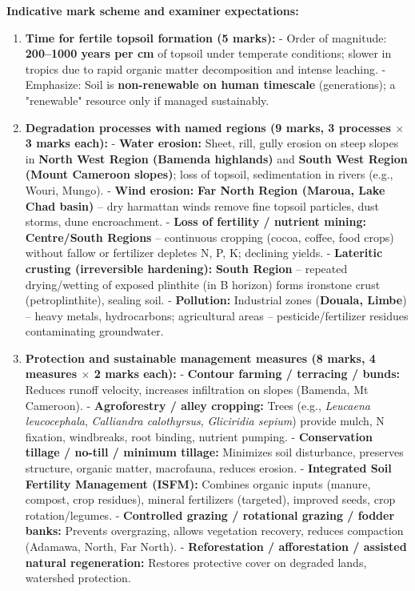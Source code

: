 \documentclass[11pt]{article}
\begin{document}
\begin{corrige}
\textbf{Indicative mark scheme and examiner expectations:}
\begin{enumerate}
\item \textbf{Time for fertile topsoil formation (5 marks):}  
  - Order of magnitude: \textbf{200–1000 years per cm} of topsoil under temperate conditions; slower in tropics due to rapid organic matter decomposition and intense leaching.  
  - Emphasize: Soil is \textbf{non-renewable on human timescale} (generations); a "renewable" resource only if managed sustainably.

\item \textbf{Degradation processes with named regions (9 marks, 3 processes $\times$ 3 marks each):}  
  - \textbf{Water erosion:} Sheet, rill, gully erosion on steep slopes in \textbf{North West Region (Bamenda highlands)} and \textbf{South West Region (Mount Cameroon slopes)}; loss of topsoil, sedimentation in rivers (e.g., Wouri, Mungo).  
  - \textbf{Wind erosion:} \textbf{Far North Region (Maroua, Lake Chad basin)} – dry harmattan winds remove fine topsoil particles, dust storms, dune encroachment.  
  - \textbf{Loss of fertility / nutrient mining:} \textbf{Centre/South Regions} – continuous cropping (cocoa, coffee, food crops) without fallow or fertilizer depletes N, P, K; declining yields.  
  - \textbf{Lateritic crusting (irreversible hardening):} \textbf{South Region} – repeated drying/wetting of exposed plinthite (in B horizon) forms ironstone crust (petroplinthite), sealing soil.  
  - \textbf{Pollution:} Industrial zones (\textbf{Douala, Limbe}) – heavy metals, hydrocarbons; agricultural areas – pesticide/fertilizer residues contaminating groundwater.

\item \textbf{Protection and sustainable management measures (8 marks, 4 measures $\times$ 2 marks each):}  
  - \textbf{Contour farming / terracing / bunds:} Reduces runoff velocity, increases infiltration on slopes (Bamenda, Mt Cameroon).  
  - \textbf{Agroforestry / alley cropping:} Trees (e.g., \textit{Leucaena leucocephala}, \textit{Calliandra calothyrsus}, \textit{Gliciridia sepium}) provide mulch, N fixation, windbreaks, root binding, nutrient pumping.  
  - \textbf{Conservation tillage / no-till / minimum tillage:} Minimizes soil disturbance, preserves structure, organic matter, macrofauna, reduces erosion.  
  - \textbf{Integrated Soil Fertility Management (ISFM):} Combines organic inputs (manure, compost, crop residues), mineral fertilizers (targeted), improved seeds, crop rotation/legumes.  
  - \textbf{Controlled grazing / rotational grazing / fodder banks:} Prevents overgrazing, allows vegetation recovery, reduces compaction (Adamawa, North, Far North).  
  - \textbf{Reforestation / afforestation / assisted natural regeneration:} Restores protective cover on degraded lands, watershed protection.


\end{enumerate}
\end{corrige}
\end{document}
